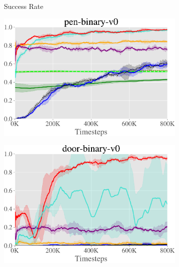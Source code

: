 \begin{figure}[t]
    \centering
    \begin{subfigure}[b]{0.02\textwidth}
        \center
        \begin{turn}{90} 
            \footnotesize
            Success Rate
        \end{turn}
        \vspace{1cm}
    \end{subfigure}
    \begin{subfigure}[b]{0.3\textwidth}
        \center
        \includegraphics[width=1\textwidth]{awac/figures/hand/pen-crop.pdf}
    \end{subfigure}
    \begin{subfigure}[b]{0.3\textwidth}
        \center
        \includegraphics[width=1\textwidth]{awac/figures/hand/door-crop.pdf}
    \end{subfigure}

\end{figure}

